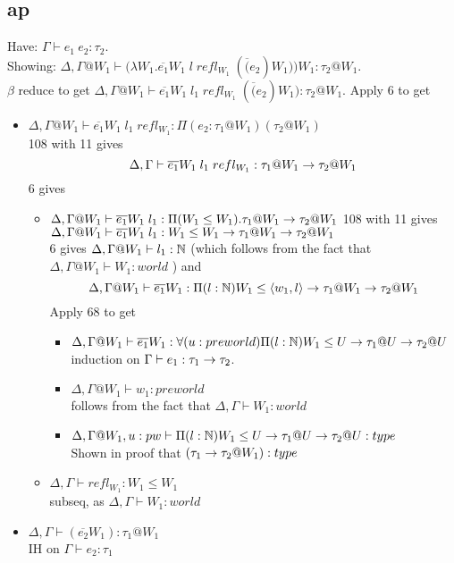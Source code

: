 \documentclass{article}
\begin{document}
\subsection{ap}
Have: $\Gamma \vdash e_1 \: e_2 : \tau_2$. \\
Showing: $\Delta, \Gamma@W_1 \vdash \big(\lambda W_1. \overline{e_1}W_1 \; l \; refl_{W_1} \; (\overline(e_2) W_1) \big) W_1 : \tau_2 @ W_1$. \\
$\beta$ reduce to get 
 $\Delta,\Gamma@W_1 \vdash  \overline{e_1}W_1 \; l_1 \; refl_{W_1} \; (\overline(e_2) W_1) : \tau_2 @ W_1$.
Apply 6 to get
\begin{itemize}
    \item $\Delta,\Gamma@W_1  \vdash \overline{e_1}W_1 \; l_1 \; refl_{W_1}: \Pi(e_2: \tau_1 @ W_1)(\tau_2 @ W_1)$\\
    108 with 11 gives \\
     \[\Delta,\Gamma \vdash \overline{e_1}W_1 \; l_1 \; refl_{W_1}: \tau_1 @ W_1 \rightarrow \tau_2 @ W_1\]
     6 gives 
     \begin{itemize}
         \item  $\Delta, \Gamma@W_1  \vdash \overline{e_1}W_1 \; l_1: \Pi(W_1 \leq W_1).\tau_1 @ W_1 \imp \tau_2 @ W_1$
         108 with 11 gives\\
         $\Delta,\Gamma@W_1 \vdash \overline{e_1}W_1 \; l_1: W_1 \leq W_1 \imp \tau_1 @ W_1 \imp \tau_2 @ W_1$\\
         6 gives $\Delta,\Gamma@W_1  \vdash l_1 : \N$ (which follows from the fact that $\Delta,\Gamma@W_1  \vdash W_1 : world$ ) and
        \[\Delta,\Gamma@W_1 \vdash \overline{e_1}W_1: \Pi(l : \N) W_1 \leq \langle w_1, l \rangle \imp \tau_1 @ W_1 \imp \tau_2 @ W_1\]
         Apply 68 to get
         \begin{itemize}
             \item $\Delta,\Gamma@W_1 \vdash \overline{e_1}W_1: \forall(u: preworld)\Pi(l : \N) W_1 \leq U \imp \tau_1 @U  \imp \tau_2 @ U$\\
             induction on $\Gamma \vdash e_1 : \tau_1 \rightarrow \tau_2$.
             \item $\Delta,\Gamma@W_1  \vdash w_1 : preworld$\\
             follows from the fact that $\Delta,\Gamma \vdash W_1 : world$
             \item $\Delta,\Gamma@W_1 , u : pw \vdash \Pi(l : \N) W_1 \leq U \imp \tau_1 @ U \imp \tau_2 @ U: type$\\
             Shown in proof that $(\tau_1 \rightarrow \tau_2 @ W_1) : type$
         \end{itemize}
         \item $\Delta,\Gamma \vdash refl_{W_1} : W_1 \leq W_1$\\
         subseq, as $\Delta,\Gamma \vdash  W_1 : world$
     \end{itemize}

    \item $\Delta,\Gamma \vdash (\overline{e_2} W_1) : \tau_1 @ W_1$\\
IH on $\Gamma \vdash e_2 : \tau_1$
\end{itemize}
\end{document}
